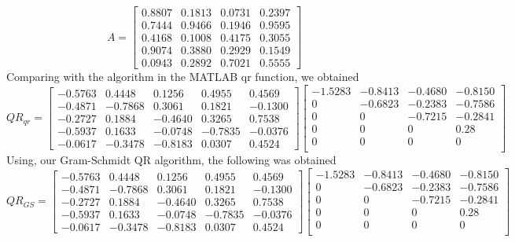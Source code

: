 \documentclass{article}
\begin{document}
$$ A = \begin{bmatrix} 
    0.8807 &   0.1813 &    0.0731    &0.2397\\
    0.7444   & 0.9466  &  0.1946    &0.9595\\
    0.4168    &0.1008   & 0.4175   & 0.3055\\
    0.9074   & 0.3880    &0.2929    &0.1549\\
    0.0943    &0.2892    &0.7021    &0.5555 
\end{bmatrix} 
$$
Comparing with the algorithm in the MATLAB qr function, we obtained
$$Q R_{qr} =  
\begin{bmatrix}
    -0.5763   & 0.4448  &  0.1256&    0.4955&    0.4569\\
   -0.4871   &-0.7868   & 0.3061   & 0.1821   &-0.1300\\
   -0.2727   & 0.1884   &-0.4640    &0.3265  &0.7538\\
   -0.5937    &0.1633   &-0.0748   &-0.7835   &-0.0376\\
   -0.0617   &-0.3478   &-0.8183   & 0.0307    &0.4524
\end{bmatrix}
  \begin{bmatrix}
   -1.5283 &  -0.8413 &  -0.4680  & -0.8150\\
         0  & -0.6823  & -0.2383  & -0.7586\\
         0    &     0   &-0.7215   &-0.2841\\
         0      &   0    &     0   & 0.28\\
         0        & 0      &  0      &   0\\ 
         \end{bmatrix} $$ 
 Using, our Gram-Schmidt QR algorithm, the following was obtained 
$$Q R_{GS} =  
\begin{bmatrix}
    -0.5763   & 0.4448  &  0.1256&    0.4955&    0.4569\\
   -0.4871   &-0.7868   & 0.3061   & 0.1821   &-0.1300\\
   -0.2727   & 0.1884   &-0.4640    &0.3265  &0.7538\\
   -0.5937    &0.1633   &-0.0748   &-0.7835   &-0.0376\\
   -0.0617   &-0.3478   &-0.8183   & 0.0307    &0.4524
\end{bmatrix}
  \begin{bmatrix}
   -1.5283 &  -0.8413 &  -0.4680  & -0.8150\\
         0  & -0.6823  & -0.2383  & -0.7586\\
         0    &     0   &-0.7215   &-0.2841\\
         0      &   0    &     0   & 0.28\\
         0        & 0      &  0      &   0\\ 
         \end{bmatrix} $$ 
\end{document}
